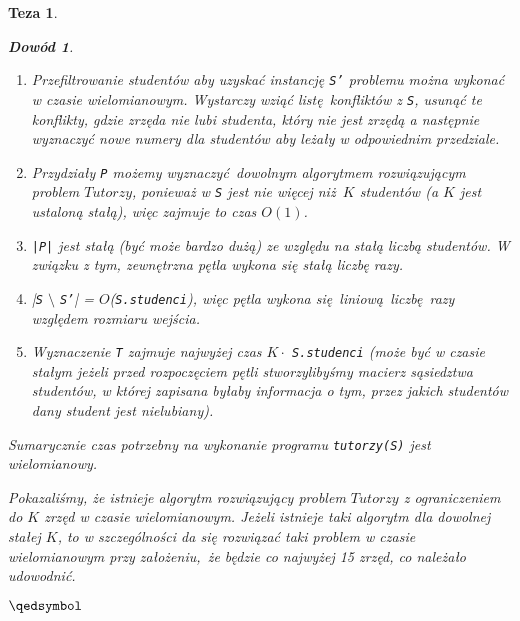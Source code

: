 \documentclass[12pt]{article}
\newtheorem*{theorem*}{Teza}
\newtheorem*{proof*}{Dowód}
\begin{document}
\begin{titlepage}
\begin{theorem*}
\begin{proof*}
\begin{enumerate}
    \item Przefiltrowanie studentów aby uzyskać instancję \texttt{S'} problemu 
    można wykonać w czasie wielomianowym. Wystarczy wziąć listę konfliktów z 
    \texttt{S}, usunąć te konflikty, gdzie zrzęda nie lubi studenta, który nie 
    jest zrzędą a następnie wyznaczyć nowe numery dla studentów aby leżały w 
    odpowiednim przedziale.
    \item Przydziały \texttt{P} możemy wyznaczyć dowolnym algorytmem 
    rozwiązującym problem $Tutorzy$, ponieważ w \texttt{S} jest nie więcej 
    niż $K$ studentów (a $K$ jest ustaloną stałą), więc zajmuje to czas $O(1)$.
    \item \texttt{|P|} jest stałą (być może bardzo dużą) ze względu na stałą 
    liczbą studentów. W związku z tym, zewnętrzna pętla wykona się stałą liczbę 
    razy.
    \item |\texttt{S} $\setminus$ \texttt{S'}| = $O$(\texttt{S.studenci}), więc 
    pętla wykona się liniową liczbę razy względem rozmiaru wejścia.
    \item Wyznaczenie \texttt{T} zajmuje najwyżej czas $K\cdot$ \texttt{S.studenci} (może być w czasie stałym jeżeli przed rozpoczęciem pętli stworzylibyśmy macierz sąsiedztwa studentów, w której zapisana byłaby informacja o tym, przez jakich studentów dany student jest nielubiany).
\end{enumerate}

Sumarycznie czas potrzebny na wykonanie programu \texttt{tutorzy(S)} jest 
wielomianowy.

$ $\\
Pokazaliśmy, że istnieje algorytm rozwiązujący problem $Tutorzy$ z 
ograniczeniem do $K$ zrzęd w czasie wielomianowym. Jeżeli istnieje taki 
algorytm dla dowolnej stałej $K$, to w szczególności da się rozwiązać taki 
problem w czasie wielomianowym przy założeniu, że będzie co najwyżej 15 zrzęd, 
co należało udowodnić.
\begin{flushright}
    $\qedsymbol$
\end{flushright}

\end{proof*} \end{theorem*}

\end{titlepage}
\end{document}
